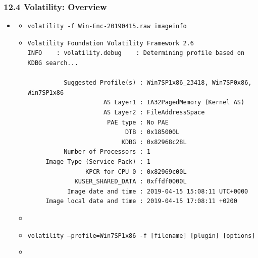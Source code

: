 \begin{frame}[fragile]
  \frametitle{12.4 Volatility: Overview}
    \begin{itemize}
        \item[]
            \begin{itemize}
                \item[] \texttt{volatility -f Win-Enc-20190415.raw imageinfo}
                \item[]
                \begin{lstlisting}[basicstyle=\tiny]
Volatility Foundation Volatility Framework 2.6
INFO    : volatility.debug    : Determining profile based on KDBG search...

          Suggested Profile(s) : Win7SP1x86_23418, Win7SP0x86, Win7SP1x86
                     AS Layer1 : IA32PagedMemory (Kernel AS)
                     AS Layer2 : FileAddressSpace
                      PAE type : No PAE
                           DTB : 0x185000L
                          KDBG : 0x82968c28L
          Number of Processors : 1
     Image Type (Service Pack) : 1
                KPCR for CPU 0 : 0x82969c00L
             KUSER_SHARED_DATA : 0xffdf0000L
           Image date and time : 2019-04-15 15:08:11 UTC+0000
     Image local date and time : 2019-04-15 17:08:11 +0200
		\end{lstlisting}
                \item[]
                \item[] \texttt{volatility --profile=Win7SP1x86 -f [filename] [plugin] [options]}
                \item[]
            \end{itemize}
    \end{itemize}
\end{frame}


